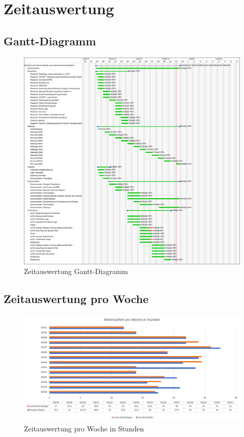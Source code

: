 \section{Zeitauswertung}

\subsection{Gantt-Diagramm}
\begin{figure}[H]
    \centering
    \includegraphics[width=1\linewidth]{assets/zeitauswertung_gantt.png}
    \caption{Zeitauswertung Gantt-Diagramm}
\end{figure}

\subsection{Zeitauswertung pro Woche}
\begin{figure}[H]
    \centering
    \includegraphics[width=1\linewidth]{assets/zeitauswertung_woche.png}
    \caption{Zeitauswertung pro Woche in Stunden}
\end{figure}

